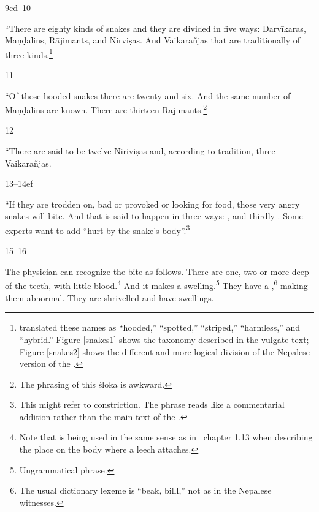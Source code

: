     \begin{translation}
        \item[9cd--10]    
        
        “There are eighty kinds of snakes and they are divided in five ways:
        Darvīkaras, Maṇḍalins, Rājimants, and Nirviṣas.  And Vaikarañjas that are
        traditionally of three kinds.\footnote{\citet{hari-2011} translated these
            names as “hooded,” “spotted,” “striped,” “harmless,” and “hybrid.” Figure 
            \ref{snakes1} shows the taxonomy described in the vulgate text; Figure 
            \ref{snakes2} shows the different and more logical division of the Nepalese 
            version of the \SS.}
            
    \item [11] 
    
    “Of those hooded snakes there are twenty and six. And the same number of
Maṇḍalins are known.  There are thirteen Rājīmants.\footnote{The 
    phrasing of this śloka is awkward.}
    
    \item [12]
    
    “There are said to be twelve Niriviṣas and, according to tradition, three 
    Vaikarañjas.
    
    \item [13--14ef]
    
“If they are trodden on, bad or provoked or looking for food, those very
angry snakes will bite.  And that is said to happen in three ways:
,  and thirdly .  Some experts want to add “hurt by the snake's body”.\footnote{This 
    might refer to constriction.  The phrase reads like a commentarial addition 
    rather than the main text of the \SS.}

\item[15--16]

The physician can recognize the  bite as follows.
There are one, two or more deep  of the
teeth, with little blood.\footnote{Note that  is being used in the
    same sense as in \SS\ chapter 1.13 when describing the place on the body
    where a leech attaches.} And it makes a swelling.\footnote{Ungrammatical
        phrase.}  They have a ,\footnote{The usual dictionary lexeme is  
            “beak,
            billl,” not  as in the Nepalese witnesses.} making them 
            abnormal. They are
            shrivelled and have swellings.

    
\end{translation}